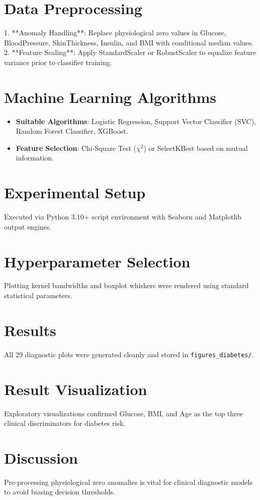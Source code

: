 \documentclass[12pt,a4paper]{article}
\begin{document}
\section{Data Preprocessing}
1. **Anomaly Handling**: Replace physiological zero values in Glucose, BloodPressure, SkinThickness, Insulin, and BMI with conditional median values.
2. **Feature Scaling**: Apply StandardScaler or RobustScaler to equalize feature variance prior to classifier training.

\section{Machine Learning Algorithms}
\begin{itemize}[noitemsep]
    \item \textbf{Suitable Algorithms}: Logistic Regression, Support Vector Classifier (SVC), Random Forest Classifier, XGBoost.
    \item \textbf{Feature Selection}: Chi-Square Test ($\chi^2$) or SelectKBest based on mutual information.
\end{itemize}

\section{Experimental Setup}
Executed via Python 3.10+ script environment with Seaborn and Matplotlib output engines.

\section{Hyperparameter Selection}
Plotting kernel bandwidths and boxplot whiskers were rendered using standard statistical parameters.

\section{Results}
All 29 diagnostic plots were generated cleanly and stored in \texttt{figures\_diabetes/}.

\section{Result Visualization}
Exploratory visualizations confirmed Glucose, BMI, and Age as the top three clinical discriminators for diabetes risk.

\section{Discussion}
Pre-processing physiological zero anomalies is vital for clinical diagnostic models to avoid biasing decision thresholds.
\end{document}
